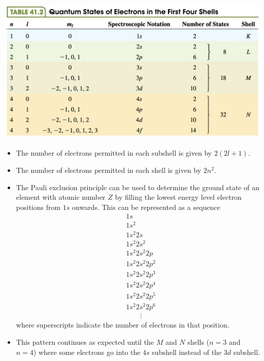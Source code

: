 \documentclass{article}
\begin{document}
\includegraphics[scale=0.516]{shell-states}

\begin{itemize}
  \item The number of electrons permitted in each subshell is given by $2 (2 l + 1)$.

  \item The number of electrons permitted in each shell is given by $2 n^2$.

  \item The Pauli exclusion principle can be used to determine the ground state of an element with atomic number $Z$ by filling the lowest energy level electron positions from $1 s$ onwards. This can be represented as a sequence \begin{align*}
           & 1 s               \\
           & 1 s^2             \\
           & 1 s^2 2 s         \\
           & 1 s^2 2 s^2       \\
           & 1 s^2 2 s^2 2 p   \\
           & 1 s^2 2 s^2 2 p^2 \\
           & 1 s^2 2 s^2 2 p^3 \\
           & 1 s^2 2 s^2 2 p^4 \\
           & 1 s^2 2 s^2 2 p^5 \\
           & 1 s^2 2 s^2 2 p^6 \\
           & \qquad \vdots
        \end{align*} where superscripts indicate the number of electrons in that position.

  \item This pattern continues as expected until the $M$ and $N$ shells ($n = 3$ and $n = 4$) where some electrons go into the $4 s$ subshell instead of the $3 d$ subshell.


\end{itemize}
\end{document}
